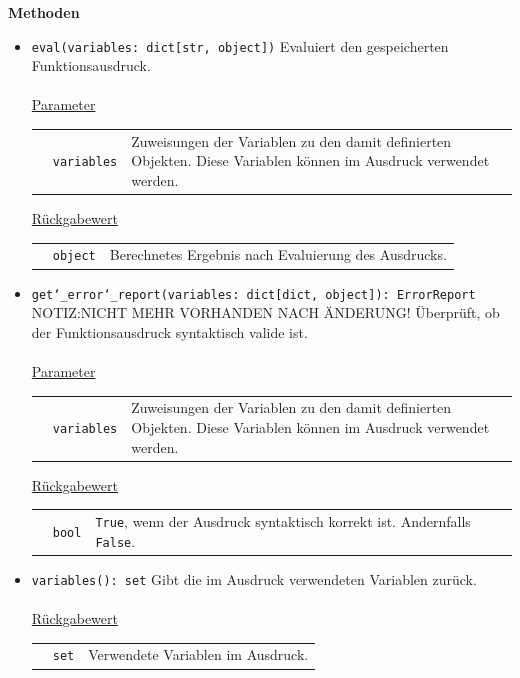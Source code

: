 \documentclass{article}
\begin{document}
\textbf{{Methoden}}
\begin{itemize}
\item \texttt{eval(variables: dict[str, object])} \newline Evaluiert den gespeicherten Funktionsausdruck.
\\\\
\underline{{Parameter}}

\begin{tabular}{lll}
 & \texttt{variables} & Zuweisungen der Variablen zu den damit definierten Objekten. Diese Variablen können im Ausdruck verwendet werden. \\
\end{tabular}

\underline{{Rückgabewert}}

\begin{tabular}{lll}
 & \texttt{object} & Berechnetes Ergebnis nach Evaluierung des Ausdrucks. \\
\end{tabular}

\item \texttt{get\char`_error\char`_report(variables: dict[dict, object]): ErrorReport} \newline NOTIZ:NICHT MEHR VORHANDEN NACH ÄNDERUNG! Überprüft, ob der Funktionsausdruck syntaktisch valide ist.
\\\\
\underline{{Parameter}}

\begin{tabular}{lll}
 & \texttt{variables} & Zuweisungen der Variablen zu den damit definierten Objekten. Diese Variablen können im Ausdruck verwendet werden. \\
\end{tabular}

\underline{{Rückgabewert}}

\begin{tabular}{lll}
 & \texttt{bool} & \texttt{True}, wenn der Ausdruck syntaktisch korrekt ist. Andernfalls \texttt{False}. \\
\end{tabular}

\item \texttt{variables(): set} \newline Gibt die im Ausdruck verwendeten Variablen zurück.
\\\\
\underline{{Rückgabewert}}

\begin{tabular}{lll}
 & \texttt{set} & Verwendete Variablen im Ausdruck. \\
\end{tabular}


\end{itemize}
\end{document}
